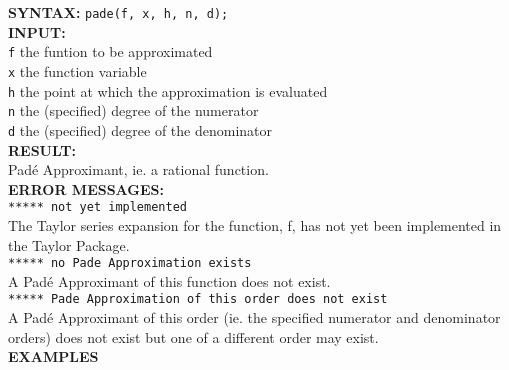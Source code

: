 \hypertarget{PADE:operator}{}

\textbf{SYNTAX:} \hspace{5mm} \texttt{pade(f, x, h, n, d);}\\[\baselineskip]

\textbf{INPUT:}\\[\baselineskip]
\texttt{f} \hspace{6mm} the funtion to be approximated\\
\texttt{x} \hspace{6mm} the function variable\\
\texttt{h} \hspace{6mm} the point at which the approximation is evaluated\\
\texttt{n} \hspace{6mm} the (specified) degree of the numerator\\
\texttt{d} \hspace{6mm} the (specified) degree of the denominator\\[\baselineskip]
\textbf{RESULT:} \\
Pad\'{e} Approximant, ie. a rational function.\\[\baselineskip]

\textbf{ERROR MESSAGES:}\\

 \hspace{6mm} \texttt{***** not yet implemented}\\

The Taylor series expansion for the function, f, has not yet
been implemented in the {\REDUCE} Taylor Package.\\[\baselineskip]

 \hspace{6mm} \texttt{***** no Pade Approximation exists}\\

A Pad\'{e} Approximant of this function does not exist.\\[\baselineskip]

 \hspace{6mm} \texttt{***** Pade Approximation of this order does not exist}\\

A Pad\'{e} Approximant of this order (ie. the specified
numerator and denominator orders) does not exist but one
of a different order may exist.\\[\baselineskip]

{\large\textbf{EXAMPLES}}

